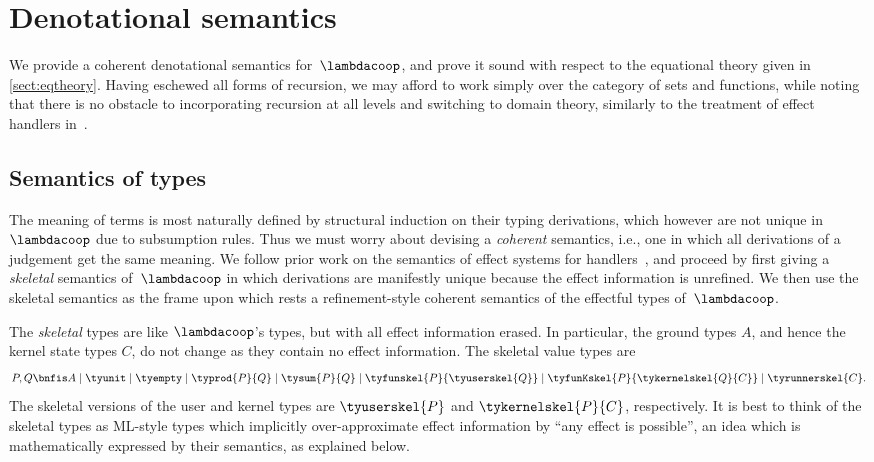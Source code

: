 
\section{Denotational semantics}
\label{sec:denotational-semantics}

We provide a coherent denotational semantics for~$\lambdacoop$, and 
prove it sound with respect to the equational theory given
in \cref{sect:eqtheory}. Having eschewed all forms of recursion,
we may afford to work simply over the category of sets and functions, while noting that
there is no obstacle to incorporating recursion at all levels and switching to domain theory,
similarly to the treatment of effect handlers in~\cite{Bauer:EffectSystem}.

\subsection{Semantics of types}
\label{sec:semantics-types}

The meaning of terms is most naturally defined by structural induction on their typing
derivations, which however are not unique in~$\lambdacoop$ due to subsumption rules.
Thus we must worry about devising a \emph{coherent} semantics, i.e., one in which all derivations
of a judgement get the same meaning.
%
We follow prior work on the semantics of effect systems for
handlers~\cite{Bauer:EffectSystem}, and proceed by first giving a \emph{skeletal}
semantics of~$\lambdacoop$ in which derivations are manifestly unique because the effect
information is unrefined. We then use the skeletal semantics as the frame upon which rests
a refinement-style coherent semantics of the effectful types of~$\lambdacoop$.

The \emph{skeletal} types are like $\lambdacoop$'s types, but with all effect information
erased. 
In particular, the ground types $A$, and hence the kernel state types $C$, do not change
as they contain no effect information. The skeletal value types are
%
\begin{equation*}
  P, Q
   \bnfis A
   \mid \tyunit
   \mid \tyempty
   \mid \typrod{P}{Q}
   \mid \tysum{P}{Q}
   \mid \tyfunskel{P}{\tyuserskel{Q}}
   \mid \tyfunKskel{P}{\tykernelskel{Q}{C}}
   \mid \tyrunnerskel{C}.
\end{equation*}
%
The skeletal versions of the user and kernel types are $\tyuserskel{P}$ and
$\tykernelskel{P}{C}$, respectively. It is best to think of the skeletal types as ML-style
types which implicitly over-approximate effect information by ``any effect is possible'',
an idea which is mathematically expressed by their semantics, as explained below.


